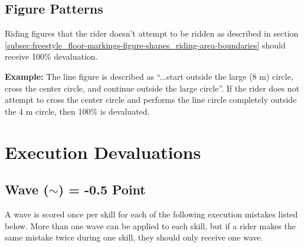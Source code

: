 \subsection{Figure Patterns}
Riding figures that the rider doesn't attempt to be ridden as described in section \ref{subsec:freestyle_floor-markings-figure-shapes_riding-area-boundaries} should receive 100\% devaluation.

\textbf{Example:} The line figure is described as ``...start outside the large (8 m) circle, cross the center circle, and continue outside the large circle''.
If the rider does not attempt to cross the center circle and performs the line circle completely outside the 4 m circle, then 100\% is devaluated.

\section{Execution Devaluations}

\subsection{Wave ($\sim$) = -0.5 Point} %
A wave is scored once per skill for each of the following execution mistakes listed below.
More than one wave can be applied to each skill, but if a rider makes the same mistake twice during one skill, they should only receive one wave.

